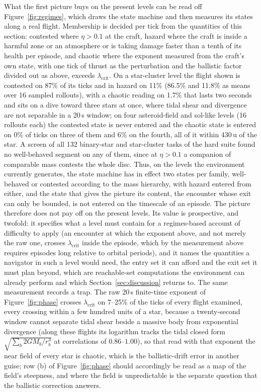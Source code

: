 \documentclass[11pt]{article}
\begin{document}
What the first picture buys on the present levels can be read off
Figure~\ref{fig:regimes}, which draws the state machine and then measures
its states along a real flight. Membership is decided per tick from the
quantities of this section: contested where $\eta > 0.1$ at the craft,
hazard where the craft is inside a harmful zone or an atmosphere or is
taking damage faster than a tenth of its health per episode, and chaotic
where the exponent measured from the craft's own state, with one tick of
thrust as the perturbation and the ballistic factor divided out as above,
exceeds $\lambda_{\mathrm{crit}}$. On a star-cluster level the flight shown
is contested on 87\% of its ticks and in hazard on 11\% (86.5\% and 11.8\%
as means over 16 sampled rollouts), with a chaotic reading on 1.7\% that
lasts two seconds and sits on a dive toward three stars at once, where tidal
shear and divergence are not separable in a 20\,s window; on four
asteroid-field and sol-like levels (16 rollouts each) the contested state is
never entered and the chaotic state is entered on 0\% of ticks on three of
them and 6\% on the fourth, all of it within 430\,u of the star. A screen of
all 132 binary-star and star-cluster tasks of the hard suite found no
well-behaved segment on any of them, since at $\eta > 0.1$ a companion of
comparable mass contests the whole disc. Thus, on the levels the environment
currently generates, the state machine has in effect two states per family,
well-behaved or contested according to the mass hierarchy, with hazard
entered from either, and the state that gives the picture its content, the
encounter whose exit can only be bounded, is not entered on the timescale of
an episode. The picture therefore does not pay off on the present levels.
Its value is prospective, and twofold: it specifies what a level must
contain for a regimes-based account of difficulty to apply (an encounter at
which the exponent above, and not merely the raw one, crosses
$\lambda_{\mathrm{crit}}$ inside the episode, which by the measurement above
requires episodes long relative to orbital periods), and it names the
quantities a navigator in such a level would need, the entry set it can
afford and the exit set it must plan beyond, which are reachable-set
computations the environment can already perform and which
Section~\ref{sec:discussion} returns to. The same measurement records a
trap. The raw 20\,s finite-time exponent of Figure~\ref{fig:phase} crosses
$\lambda_{\mathrm{crit}}$ on 7--25\% of the ticks of every flight examined,
every crossing within a few hundred units of a star, because a twenty-second
window cannot separate tidal shear beside a massive body from exponential
divergence (along these flights its logarithm tracks the tidal closed form
$\sqrt{\sum_b 2GM_b/r_b^3}$ at correlations of $0.86$--$1.00$), so that read
with that exponent the near field of every star is chaotic, which is the
ballistic-drift error in another guise; row (b) of Figure~\ref{fig:phase}
should accordingly be read as a map of the field's steepness, and where the
field is unpredictable is the separate question that the ballistic
correction answers.
\end{document}
